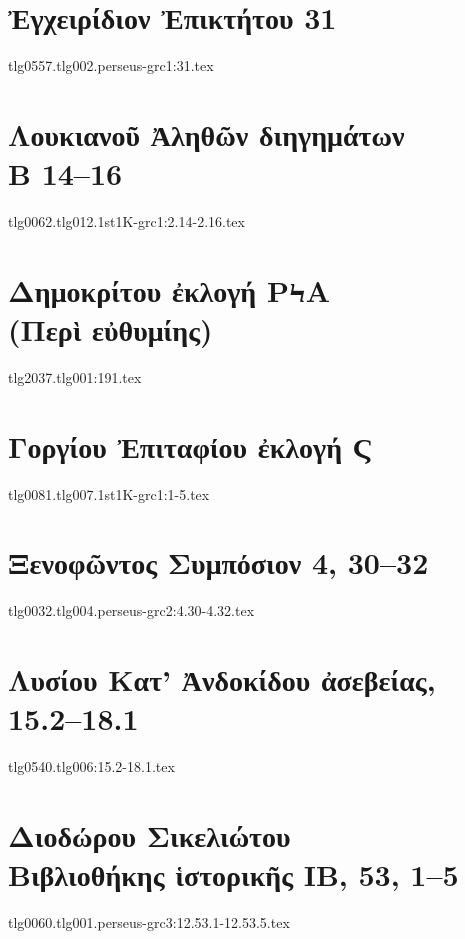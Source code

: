 \documentclass[a4paper,12pt,twoside]{report}
\begin{document}
\chapter[Ἐγχειρίδιον Ἐπικτήτου 31]{\textgreek[variant=ancient]{Ἐγχειρίδιον Ἐπικτήτου} 31}

{tlg0557.tlg002.perseus-grc1:31.tex}


\chapter[Λουκιανοῦ Ἀληθῶν διηγημάτων Β]{\textgreek[variant=ancient]{Λουκιανοῦ Ἀληθῶν διηγημάτων \\Β} 14–16}

{tlg0062.tlg012.1st1K-grc1:2.14-2.16.tex}


\chapter[Δημοκρίτου ἐκλογή ΡϞΑ]{\textgreek[variant=ancient]{Δημοκρίτου ἐκλογή ΡϞΑ \\(Περὶ εὐθυμίης)}}

{tlg2037.tlg001:191.tex}




\chapter[Γοργίου Ἐπιτάφιος]{\textgreek[variant=ancient]{Γοργίου Ἐπιταφίου ἐκλογή Ϛ}}
\label{chap:gorgias}

{tlg0081.tlg007.1st1K-grc1:1-5.tex}


\chapter[Ξενοφῶντος Συμπόσιον]{\textgreek[variant=ancient]{Ξενοφῶντος Συμπόσιον} 4, 30–32}

{tlg0032.tlg004.perseus-grc2:4.30-4.32.tex}


\chapter[Λυσίου Κατ' Ἀνδοκίδου ἀσεβείας]{\textgreek[variant=ancient]{Λυσίου Κατ' Ἀνδοκίδου ἀσεβείας,} 15.2–18.1}

{tlg0540.tlg006:15.2-18.1.tex}



\chapter[Διοδώρου Βιβλιοθήκης ἱστορικής ΙΒ]{\textgreek[variant=ancient]{Διοδώρου Σικελιώτου \\Βιβλιοθήκης ἱστορικῆς ΙΒ,} 53, 1–5}

{tlg0060.tlg001.perseus-grc3:12.53.1-12.53.5.tex}
\end{document}
